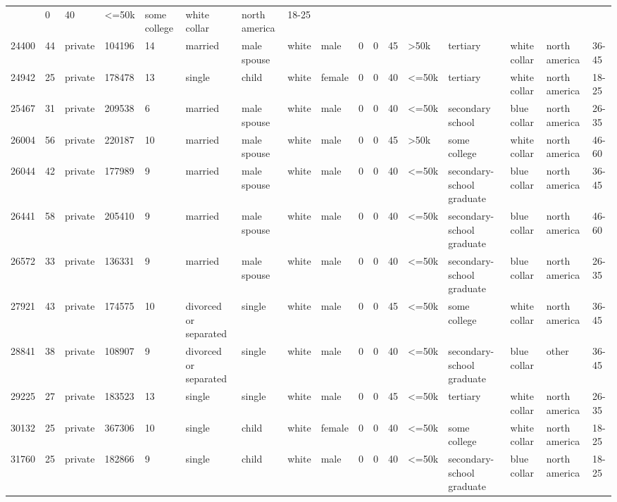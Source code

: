 \documentclass[
  letterpaper,
  DIV=11,
  numbers=noendperiod]{scrartcl}
\begin{document}
\begin{longtable}[]{@{}lllllllllllllllll@{}}
& 0 & 40 & \textless=50k & some college & white collar & north america &
18-25 \\
24400 & 44 & private & 104196 & 14 & married & male spouse & white &
male & 0 & 0 & 45 & \textgreater50k & tertiary & white collar & north
america & 36-45 \\
24942 & 25 & private & 178478 & 13 & single & child & white & female & 0
& 0 & 40 & \textless=50k & tertiary & white collar & north america &
18-25 \\
25467 & 31 & private & 209538 & 6 & married & male spouse & white & male
& 0 & 0 & 40 & \textless=50k & secondary school & blue collar & north
america & 26-35 \\
26004 & 56 & private & 220187 & 10 & married & male spouse & white &
male & 0 & 0 & 45 & \textgreater50k & some college & white collar &
north america & 46-60 \\
26044 & 42 & private & 177989 & 9 & married & male spouse & white & male
& 0 & 0 & 40 & \textless=50k & secondary-school graduate & blue collar &
north america & 36-45 \\
26441 & 58 & private & 205410 & 9 & married & male spouse & white & male
& 0 & 0 & 40 & \textless=50k & secondary-school graduate & blue collar &
north america & 46-60 \\
26572 & 33 & private & 136331 & 9 & married & male spouse & white & male
& 0 & 0 & 40 & \textless=50k & secondary-school graduate & blue collar &
north america & 26-35 \\
27921 & 43 & private & 174575 & 10 & divorced or separated & single &
white & male & 0 & 0 & 45 & \textless=50k & some college & white collar
& north america & 36-45 \\
28841 & 38 & private & 108907 & 9 & divorced or separated & single &
white & male & 0 & 0 & 40 & \textless=50k & secondary-school graduate &
blue collar & other & 36-45 \\
29225 & 27 & private & 183523 & 13 & single & single & white & male & 0
& 0 & 45 & \textless=50k & tertiary & white collar & north america &
26-35 \\
30132 & 25 & private & 367306 & 10 & single & child & white & female & 0
& 0 & 40 & \textless=50k & some college & white collar & north america &
18-25 \\
31760 & 25 & private & 182866 & 9 & single & child & white & male & 0 &
0 & 40 & \textless=50k & secondary-school graduate & blue collar & north
america & 18-25 \\
\end{longtable}
\end{document}
